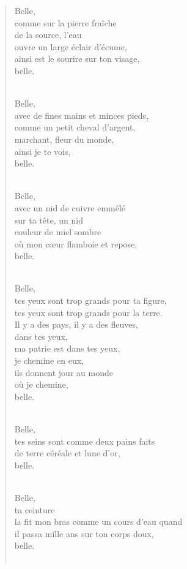 \documentclass[11pt,a4paper]{book}
\begin{document}
\begin{verse}
Belle, \\
comme sur la pierre fraîche \\
de la source, l'eau \\
ouvre un large éclair d'écume, \\
ainsi est le sourire sur ton visage, \\
belle. \\ \

Belle, \\
avec de fines mains et minces pieds, \\
comme un petit cheval d'argent, \\
marchant, fleur du monde, \\
ainsi je te vois, \\
belle. \\ \

Belle, \\
avec un nid de cuivre emmêlé \\
sur ta tête, un nid \\
couleur de miel sombre \\
où mon c{\oe}ur flamboie et repose, \\
belle. \\ \

Belle, \\
tes yeux sont trop grands pour ta figure, \\
tes yeux sont trop grands pour la terre. \\
Il y a des pays, il y a des fleuves, \\
dans tes yeux, \\
ma patrie est dans tes yeux, \\
je chemine en eux, \\
ils donnent jour au monde \\
où je chemine, \\
belle. \\ \

Belle, \\
tes seins sont comme deux pains faits \\
de terre céréale et lune d'or, \\
belle. \\ \

Belle, \\
ta ceinture \\
la fit mon bras comme un cours d'eau quand \\
il passa mille ans sur ton corps doux, \\
belle. \\ \


\end{verse}
\end{document}
